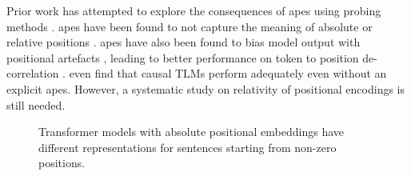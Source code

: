 \documentclass[letterpaper, 12pt]{report}
\begin{document}
Prior work has attempted to explore the consequences of \acrshort{ape}s using probing methods \citep{wang2021on}.
\acrshort{ape}s have been found to not capture the meaning of absolute or relative positions \citep{wang-chen-2020-position}.
\acrshort{ape}s have also been found to bias model output with positional artefacts \citep{luo-etal-2021-positional}, leading to better performance on token to position de-correlation \citep{ke2021}.
\citet{haviv2022} even find that causal TLMs perform adequately even without an explicit \acrshort{ape}s.
However, a systematic study on relativity of positional encodings is still needed.

\begin{figure}
    \centering
    \caption{Transformer models with absolute positional embeddings have different representations for sentences starting from non-zero positions. }
    \label{fig:bert_confused}
\end{figure}
\end{document}

